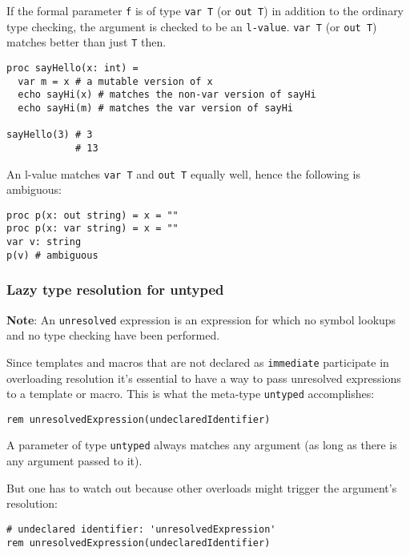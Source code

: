 If the formal parameter \texttt{f} is of type \texttt{var\ T} (or
\texttt{out\ T}) in addition to the ordinary type checking, the argument
is checked to be an \texttt{l-value}. \texttt{var\ T} (or
\texttt{out\ T}) matches better than just \texttt{T} then.

\begin{verbatim}
proc sayHello(x: int) =
  var m = x # a mutable version of x
  echo sayHi(x) # matches the non-var version of sayHi
  echo sayHi(m) # matches the var version of sayHi

sayHello(3) # 3
            # 13
\end{verbatim}

An l-value matches \texttt{var\ T} and \texttt{out\ T} equally well,
hence the following is ambiguous:

\begin{verbatim}
proc p(x: out string) = x = ""
proc p(x: var string) = x = ""
var v: string
p(v) # ambiguous
\end{verbatim}

\hypertarget{lazy-type-resolution-for-untyped}{%
\subsubsection{Lazy type resolution for
untyped}\label{lazy-type-resolution-for-untyped}}

\textbf{Note}: An \texttt{unresolved} expression is an expression for
which no symbol lookups and no type checking have been performed.

Since templates and macros that are not declared as \texttt{immediate}
participate in overloading resolution it's essential to have a way to
pass unresolved expressions to a template or macro. This is what the
meta-type \texttt{untyped} accomplishes:

\begin{verbatim}
rem unresolvedExpression(undeclaredIdentifier)
\end{verbatim}

A parameter of type \texttt{untyped} always matches any argument (as
long as there is any argument passed to it).

But one has to watch out because other overloads might trigger the
argument's resolution:

\begin{verbatim}
# undeclared identifier: 'unresolvedExpression'
rem unresolvedExpression(undeclaredIdentifier)
\end{verbatim}

